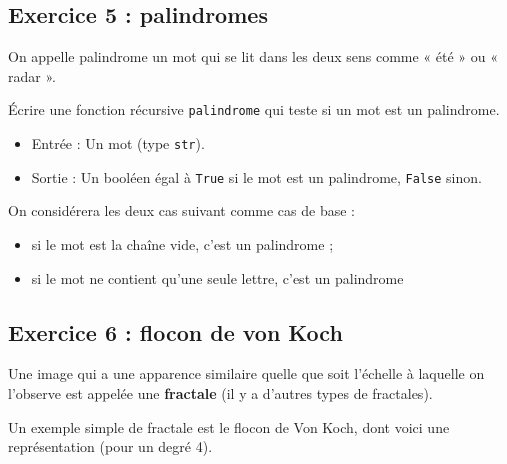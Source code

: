 \documentclass[
  a4paper,
  DIV=11,
  numbers=noendperiod]{scrartcl}
\providecommand{\tightlist}{%
  \setlength{\itemsep}{0pt}\setlength{\parskip}{0pt}}\usepackage{longtable,booktabs,array}
\begin{document}
\hypertarget{fa-desktop-exercice-5-palindromes}{%
\subsection{\texorpdfstring{ Exercice 5 :
palindromes}{ Exercice 5 : palindromes}}\label{fa-desktop-exercice-5-palindromes}}

On appelle palindrome un mot qui se lit dans les deux sens comme « été »
ou « radar ».

Écrire une fonction récursive \texttt{palindrome} qui teste si un mot
est un palindrome.

\begin{itemize}
\tightlist
\item
  Entrée : Un mot (type \texttt{str}).
\item
  Sortie : Un booléen égal à \texttt{True} si le mot est un palindrome,
  \texttt{False} sinon.
\end{itemize}

On considérera les deux cas suivant comme cas de base :

\begin{itemize}
\tightlist
\item
  si le mot est la chaîne vide, c'est un palindrome ;
\item
  si le mot ne contient qu'une seule lettre, c'est un palindrome
\end{itemize}

\hypertarget{fa-solid-pencil-alt-fa-desktop-exercice-6-flocon-de-von-koch}{%
\subsection{\texorpdfstring{ 
Exercice 6 : flocon de von
Koch}{  Exercice 6 : flocon de von Koch}}\label{fa-solid-pencil-alt-fa-desktop-exercice-6-flocon-de-von-koch}}

Une image qui a une apparence similaire quelle que soit l'échelle à
laquelle on l'observe est appelée une \textbf{fractale} (il y a d'autres
types de fractales).

Un exemple simple de fractale est le flocon de Von Koch, dont voici une
représentation (pour un degré 4).
\end{document}
